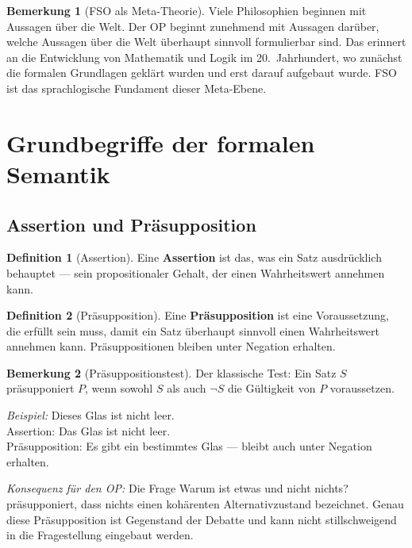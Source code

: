 \documentclass[11pt,a4paper]{article}
\theoremstyle{plain}
\theoremstyle{definition}
\newtheorem{definition}{Definition}[section]
\newtheorem{remark}{Bemerkung}[section]
\begin{document}
\begin{remark}[FSO als Meta-Theorie]
Viele Philosophien beginnen mit Aussagen \"{u}ber die Welt. Der OP beginnt zunehmend
mit Aussagen dar\"{u}ber, welche Aussagen \"{u}ber die Welt \"{u}berhaupt sinnvoll
formulierbar sind. Das erinnert an die Entwicklung von Mathematik und Logik im
20.~Jahrhundert, wo zun\"{a}chst die formalen Grundlagen gekl\"{a}rt wurden und erst
darauf aufgebaut wurde. FSO ist das sprachlogische Fundament dieser Meta-Ebene.
\end{remark}

\section{Grundbegriffe der formalen Semantik}

\subsection{Assertion und Pr\"{a}supposition}

\begin{definition}[Assertion]
Eine \textbf{Assertion} ist das, was ein Satz ausdr\"{u}cklich behauptet --- sein
propositionaler Gehalt, der einen Wahrheitswert annehmen kann.
\end{definition}

\begin{definition}[Pr\"{a}supposition]
Eine \textbf{Pr\"{a}supposition} ist eine Voraussetzung, die erf\"{u}llt sein muss,
damit ein Satz \"{u}berhaupt sinnvoll einen Wahrheitswert annehmen kann.
Pr\"{a}suppositionen bleiben unter Negation erhalten.
\end{definition}

\begin{remark}[Pr\"{a}suppositionstest]
Der klassische Test: Ein Satz $S$ pr\"{a}supponiert $P$, wenn sowohl $S$ als auch
$\neg S$ die G\"{u}ltigkeit von $P$ voraussetzen.

\medskip
\textit{Beispiel:} \glqq{}Dieses Glas ist nicht leer.\grqq{}\\
Assertion: Das Glas ist nicht leer.\\
Pr\"{a}supposition: Es gibt ein bestimmtes Glas --- bleibt auch unter Negation erhalten.

\medskip
\textit{Konsequenz f\"{u}r den OP:} Die Frage \glqq{}Warum ist etwas und nicht
nichts?\grqq{} pr\"{a}supponiert, dass \glqq{}nichts\grqq{} einen koh\"{a}renten
Alternativzustand bezeichnet. Genau diese Pr\"{a}supposition ist Gegenstand der
Debatte und kann nicht stillschweigend in die Fragestellung eingebaut werden.
\end{remark}
\end{document}
